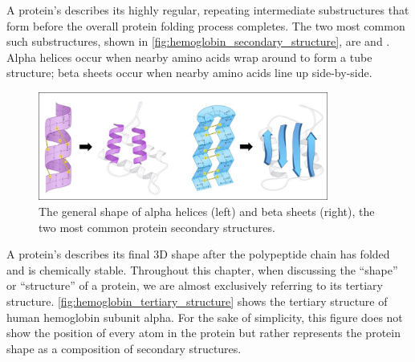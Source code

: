 A protein's  describes its highly regular, repeating intermediate substructures that form before the overall protein folding process completes. The two most common such substructures, shown in \autoref{fig:hemoglobin_secondary_structure}, are  and . Alpha helices occur when nearby amino acids wrap around to form a tube structure; beta sheets occur when nearby amino acids line up side-by-side.\\

\begin{figure}[h]
	\centering
	\mySfFamily
	\includegraphics[width = 0.85\textwidth]{../images/hemoglobin_secondary_structure.png}
	\caption{The general shape of alpha helices (left) and beta sheets (right), the two most common protein secondary structures.}
	\label{fig:hemoglobin_secondary_structure}
\end{figure}

A protein's  describes its final 3D shape after the polypeptide chain has folded and is chemically stable. Throughout this chapter, when discussing the ``shape'' or ``structure'' of a protein, we are almost exclusively referring to its tertiary structure. \autoref{fig:hemoglobin_tertiary_structure} shows the tertiary structure of human hemoglobin subunit alpha. For the sake of simplicity, this figure does not show the position of every atom in the protein but rather represents the protein shape as a composition of secondary structures.\\

